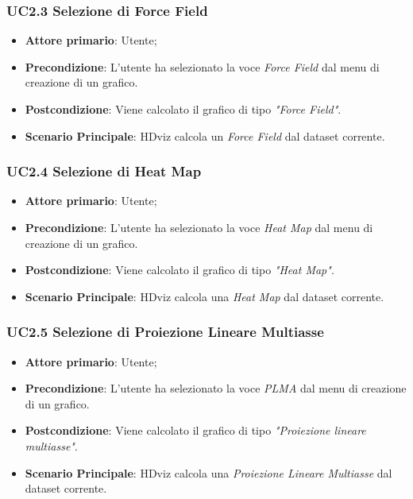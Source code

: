 \subsubsection{UC2.3 Selezione di Force Field}
\label{ssub:UC2.3}
\begin{itemize}

    \item \textbf{Attore primario}: Utente;

    \item \textbf{Precondizione}:   L'utente ha selezionato la voce \emph{Force Field} dal menu di creazione di un grafico.

    \item \textbf{Postcondizione}:  Viene calcolato il grafico di tipo \emph{"Force Field"}.
	
	\item \textbf{Scenario Principale}: HDviz calcola un \emph{Force Field} dal dataset corrente.

\end{itemize}


\subsubsection{UC2.4 Selezione di Heat Map}
\label{ssub:UC2.4}
\begin{itemize}

    \item \textbf{Attore primario}: Utente;

	\item \textbf{Precondizione}:   L'utente ha selezionato la voce \emph{Heat Map} dal menu di creazione di un grafico.

    \item \textbf{Postcondizione}:  Viene calcolato il grafico di tipo \emph{"Heat Map"}.

	\item \textbf{Scenario Principale}: HDviz calcola una \emph{Heat Map} dal dataset corrente.

\end{itemize}


\subsubsection{UC2.5 Selezione di Proiezione Lineare Multiasse}
\label{ssub:UC2.5}
\begin{itemize}

    \item \textbf{Attore primario}: Utente;

    \item \textbf{Precondizione}:   L'utente ha selezionato la voce \emph{PLMA} dal menu di creazione di un grafico.

    \item \textbf{Postcondizione}:  Viene calcolato il grafico di tipo \emph{"Proiezione lineare multiasse"}.

	\item \textbf{Scenario Principale}: HDviz calcola una \emph{Proiezione Lineare Multiasse} dal dataset corrente.
\end{itemize}

